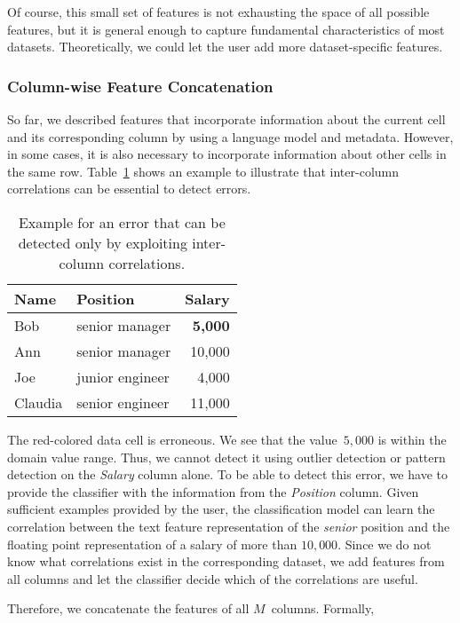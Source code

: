 Of course, this small set of features is not exhausting the space of all possible features, but it is general enough to capture fundamental characteristics of most datasets. Theoretically, we could let the user add more dataset-specific features. 

\subsubsection{Column-wise Feature Concatenation}
So far, we described features that incorporate information about the current cell and its corresponding column by using a language model and metadata. However, in some cases, it is also necessary to incorporate information about other cells in the same row.
Table~\ref{tab:columnconcat} shows an example to illustrate that inter-column correlations can be essential to detect errors. 

\begin{table}[h!]
	\centering
	\caption{Example for an error that can be detected only by exploiting inter-column correlations.}
	\label{tab:columnconcat}
	\begin{tabular}{|l|l|r|} \hline
		Name & Position & Salary \\ \hline
		Bob & senior manager & \cellcolor{red!50} \textbf{5,000} \\ \hline
		Ann & senior manager & 10,000 \\ \hline
		Joe & junior engineer & 4,000 \\ \hline
		Claudia & senior engineer & 11,000 \\ \hline
	\end{tabular}
\end{table}

The red-colored data cell is erroneous. We see that the value~$5,000$ is within the domain value range. Thus, we cannot detect it using outlier detection or pattern detection on the \emph{Salary} column alone. To be able to detect this error, we have to provide the classifier with the information from the \emph{Position} column. Given sufficient examples provided by the user, the classification model can learn the correlation between the text feature representation of the \emph{senior} position and the floating point representation of a salary of more than $10,000$. Since we do not know what correlations exist in the corresponding dataset, we add features from all columns and let the classifier decide which of the correlations are useful.

Therefore, we concatenate the features of all $M$~columns. Formally,

